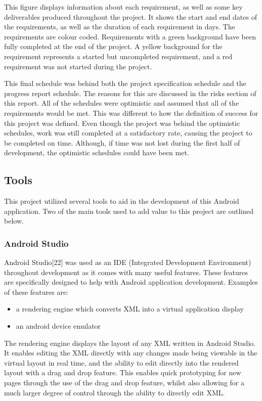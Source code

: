 \documentclass{article}
\begin{document}
This figure displays information about each requirement, as well as some key deliverables produced throughout the project. It shows the start and end dates of the requirements, as well as the duration of each requirement in days. The requirements are colour coded. Requirements with a green background have been fully completed at the end of the project. A yellow background for the requirement represents a started but uncompleted requirement, and a red requirement was not started during the project. \par

This final schedule was behind both the project specification schedule and the progress report schedule. The reasons for this are discussed in the risks section of this report. All of the schedules were optimistic and assumed that all of the requirements would be met. This was different to how the definition of success for this project was defined. Even though the project was behind the optimistic schedules, work was still completed at a satisfactory rate, causing the project to be completed on time. Although, if time was not lost during the first half of development, the optimistic schedules could have been met. \par

\subsection{Tools}

This project utilized several tools to aid in the development of this Android application. Two of the main tools used to add value to this project are outlined below.

\subsubsection{Android Studio}

Android Studio[22] was used as an IDE (Integrated Development Environment) throughout development as it comes with many useful features. These features are specifically designed to help with Android application development. Examples of these features are: 

\begin{itemize}
	\item a rendering engine which converts XML into a virtual application display
	\item an android device emulator
\end{itemize}

The rendering engine displays the layout of any XML written in Android Studio. It enables editing the XML directly with any changes made being viewable in the virtual layout in real time, and the ability to edit directly into the rendered layout with a drag and drop feature. This enables quick prototyping for new pages through the use of the drag and drop feature, whilst also allowing for a much larger degree of control through the ability to directly edit XML. \par
\end{document}
